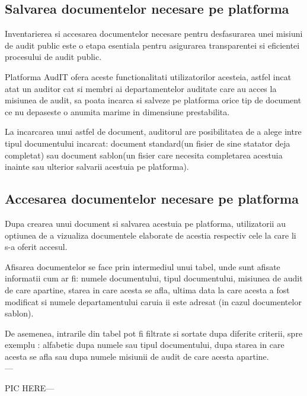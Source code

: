 \subsection{Salvarea documentelor necesare pe platforma}

Inventarierea si accesarea documentelor necesare pentru desfasurarea unei misiuni de audit public este o etapa esentiala pentru asigurarea transparentei si eficientei procesului de audit public.

Platforma AudIT ofera aceste functionalitati utilizatorilor acesteia, astfel incat atat un auditor cat si membri ai departamentelor auditate care au acces la misiunea de audit, sa poata incarca si salveze pe platforma orice tip de document ce nu depaseste o anumita marime in dimensiune prestabilita.

La incarcarea unui astfel de document, auditorul are posibilitatea de a alege intre tipul documentului incarcat: document standard(un fisier de sine statator deja completat) sau document sablon(un fisier care necesita completarea acestuia inainte sau ulterior salvarii acestuia pe platforma).






 \subsection{Accesarea documentelor necesare pe platforma}
 
 Dupa crearea unui document si salvarea acestuia pe platforma, utilizatorii au optiunea de a vizualiza documentele elaborate de acestia respectiv cele la care li s-a oferit accesul.
 
 Afisarea documentelor se face prin intermediul unui tabel, unde sunt afisate informatii cum ar fi: numele documentului, tipul documentului, misiunea de audit de care apartine, starea in care acesta se afla, ultima data la care acesta a fost modificat si numele departamentului caruia ii este adresat (in cazul documentelor sablon).
 
 De asemenea, intrarile din tabel pot fi filtrate si sortate dupa diferite criterii, spre exemplu : alfabetic dupa numele sau tipul documentului, dupa starea in care acesta se afla sau dupa numele misiunii de audit de care acesta apartine.\\
 
 ---
 
 
 
 
  PIC HERE---\\
 
